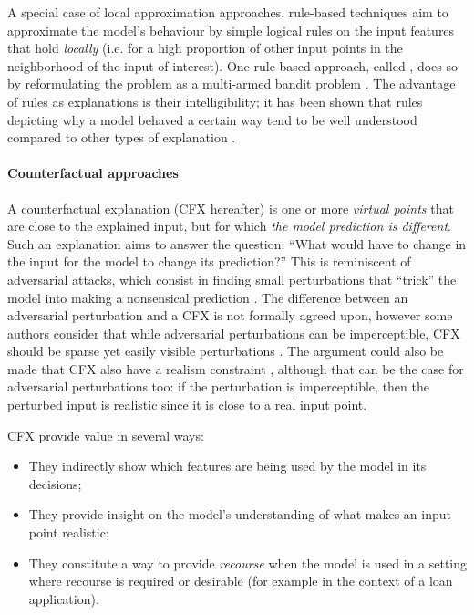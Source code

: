 \documentclass[../main.tex]{subfiles}
\begin{document}
A special case of local approximation approaches, rule-based techniques aim to approximate the model's behaviour by simple logical rules on the input features that hold \emph{locally} (i.e. for a high proportion of other input points in the neighborhood of the input of interest).
One rule-based approach, called , does so by reformulating the problem as a multi-armed bandit problem \cite{ribeiroAnchors2018}.
The advantage of rules as explanations is their intelligibility; it has been shown that rules depicting why a model behaved a certain way tend to be well understood compared to other types of explanation \cite{limWhy2009}.


\paragraph{Counterfactual approaches}

A counterfactual explanation (CFX hereafter) is one or more \emph{virtual points} that are close to the explained input, but for which \emph{the model prediction is different}.
Such an explanation aims to answer the question: ``What would have to change in the input for the model to change its prediction?''
This is reminiscent of adversarial attacks, which consist in finding small perturbations that ``trick'' the model into making a nonsensical prediction \cite{szegedyIntriguing2014,moosavi-dezfooliUniversal2017}.
The difference between an adversarial perturbation and a CFX is not formally agreed upon, however some authors consider that while adversarial perturbations can be imperceptible, CFX should be sparse yet easily visible perturbations \cite{laugelLocal2020}. The argument could also be made that CFX also have a realism constraint \citenote{}, although that can be the case for adversarial perturbations too: if the perturbation is imperceptible, then the perturbed input is realistic since it is close to a real input point.

CFX provide value in several ways:
\begin{itemize}
    \item They indirectly show which features are being used by the model in its decisions;
    \item They provide insight on the model's understanding of what makes an input point realistic;
    \item They constitute a way to provide \emph{recourse} when the model is used in a setting where recourse is required or desirable (for example in the context of a loan application).
\end{itemize}
\end{document}
